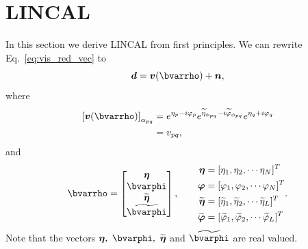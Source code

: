 \documentclass[useAMS,usenatbib]{mn2e}
\newcommand{\bd}{\bmath{d}}
\newcommand{\bv}{\bmath{v}}
\newcommand{\bn}{\bmath{n}}
\begin{document}
\section{LINCAL}
\label{sec:lincal}
In this section we derive LINCAL \citep{Liu2010} from first principles.
We can rewrite Eq.~\eqref{eq:vis_red_vec} to
\begin{equation}
\label{eq:lincal_vec}
\bd = \bv(\bvarrho) + \bn, 
\end{equation}
where 
\begin{align}
\left [ \bv(\bvarrho) \right ]_{\alpha_{pq}} &= e^{\eta_p - i \varphi_p} e^{\widetilde{\eta}_{\phi_{pq}}- i \widetilde{\varphi}_{\phi_{pq}}} e^{\eta_q + i \varphi_q}\\
&= v_{pq},
\end{align}
and
\begin{equation}
\bvarrho = 
\begin{bmatrix}
\bmath{\eta} \\
\bvarphi \\
\widetilde{\bmath{\eta}} \\
\widetilde{\bvarphi}
\end{bmatrix},\qquad
\begin{aligned}
\bmath{\eta} &= [\eta_1, \eta_2,\cdots \eta_N]^T\\
 \bmath{\varphi} &= [\varphi_1, \varphi_2,\cdots \varphi_N]^T\\
 \widetilde{\bmath{\eta}} &= [\widetilde{\eta}_1, \widetilde{\eta}_2,\cdots \widetilde{\eta}_L]^T\\
 \widetilde{\bmath{\varphi}} &= [\widetilde{\varphi}_1, \widetilde{\varphi}_2,\cdots \widetilde{\varphi}_L]^T
\end{aligned}.
\label{eq:help}
\end{equation}
Note that the vectors $\bmath{\eta},~\bvarphi,~\widetilde{\bmath{\eta}}$ and $\widetilde{\bvarphi}$ are real valued.
\end{document}
